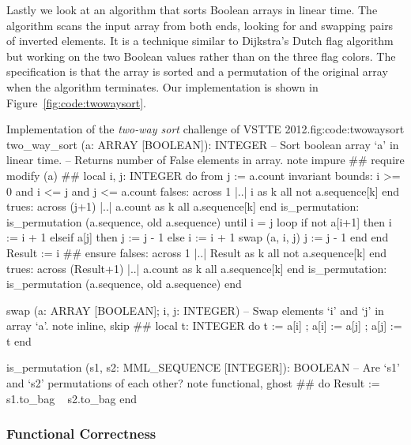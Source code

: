 Lastly we look at an algorithm that sorts Boolean arrays in linear time.
The algorithm scans the input array from both ends, looking for and swapping pairs of inverted elements.
It is a technique similar to Dijkstra's Dutch flag algorithm~\cite{DIJKSTRA76} but working on the two Boolean values rather than on the three flag colors.
The specification is that the array is sorted and a permutation of the original array when the algorithm terminates.
Our implementation is shown in Figure~\ref{fig:code:twowaysort}.

\begin{efigure}[!hp]{Implementation of the \emph{two-way sort} challenge of VSTTE 2012.}{fig:code:twowaysort}
two_way_sort (a: ARRAY [BOOLEAN]): INTEGER
		-- Sort boolean array `a' in linear time.
		-- Returns number of False elements in array.
	note impure #\label{l:twowaysort:impure}#
	require modify (a) #\label{l:twowaysort:modify}#
	local i, j: INTEGER
	do
		from j := a.count
		invariant
			bounds: i >= 0 and i <= j and j <= a.count
			falses: across 1 |..| i as k all not a.sequence[k] end
			trues: across (j+1) |..| a.count as k all a.sequence[k] end
			is_permutation: is_permutation (a.sequence, old a.sequence)
		until i = j
		loop
			if not a[i+1] then i := i + 1
			elseif a[j] then j := j - 1
			else
				i := i + 1
				swap (a, i, j)
				j := j - 1
			end
		end
		Result := i #\label{l:twowaysort:result}#
	ensure
		falses: across 1 |..| Result as k all not a.sequence[k] end
		trues: across (Result+1) |..| a.count as k all a.sequence[k] end
		is_permutation: is_permutation (a.sequence, old a.sequence)
	end

swap (a: ARRAY [BOOLEAN]; i, j: INTEGER)
		-- Swap elements `i' and `j' in array `a'.
	note inline, skip #\label{l:twowaysort:inline_skip}#
	local t: INTEGER
	do t := a[i] ; a[i] := a[j] ; a[j] := t end

is_permutation (s1, s2: MML_SEQUENCE [INTEGER]): BOOLEAN
		-- Are `s1' and `s2' permutations of each other?
	note functional, ghost #\label{l:twowaysort:func_ghost}#
	do Result := s1.to_bag ~ s2.to_bag end
\end{efigure}


\subsubsection{Functional Correctness}

